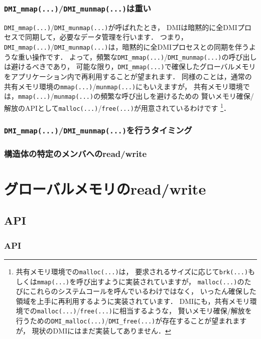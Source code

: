 \documentclass[report,12pt]{jsbook}
\begin{document}
\subsubsection{\texttt{DMI\_mmap(...)}/\texttt{DMI\_munmap(...)}は重い}

\texttt{DMI\_mmap(...)}/\texttt{DMI\_munmap(...)}が呼ばれたとき，
DMIは暗黙的に全DMIプロセスで同期して，必要なデータ管理を行います．
つまり，\texttt{DMI\_mmap(...)}/\texttt{DMI\_munmap(...)}は，暗黙的に全DMIプロセスとの同期を伴うような重い操作です．
よって，頻繁な\texttt{DMI\_mmap(...)}/\texttt{DMI\_munmap(...)}の呼び出しは避けるべきであり，
可能な限り，\texttt{DMI\_mmap(...)}で確保したグローバルメモリをアプリケーション内で再利用することが望まれます．
同様のことは，通常の共有メモリ環境の\texttt{mmap(...)}/\texttt{munmap(...)}にもいえますが，
共有メモリ環境では，\texttt{mmap(...)}/\texttt{munmap(...)}の頻繁な呼び出しを避けるための
賢いメモリ確保/解放のAPIとして\texttt{malloc(...)}/\texttt{free(...)}が用意されているわけです
\footnote{共有メモリ環境での\texttt{malloc(...)}は，
要求されるサイズに応じて\texttt{brk(...)}もしくは\texttt{mmap(...)}を呼び出すように実装されていますが，
\texttt{malloc(...)}のたびにこれらのシステムコールを呼んでいるわけではなく，
いったん確保した領域を上手に再利用するように実装されています．
DMIにも，共有メモリ環境での\texttt{malloc(...)}/\texttt{free(...)}に相当するような，
賢いメモリ確保/解放を行うための\texttt{DMI\_malloc(...)}/\texttt{DMI\_free(...)}が存在することが望まれますが，
現状のDMIにはまだ実装してありません．}．

\subsubsection{\texttt{DMI\_mmap(...)}/\texttt{DMI\_munmap(...)}を行うタイミング}

\subsubsection{構造体の特定のメンバへのread/write}

\section{グローバルメモリのread/write}

\subsection{API}

\subsubsection{API}
\end{document}
